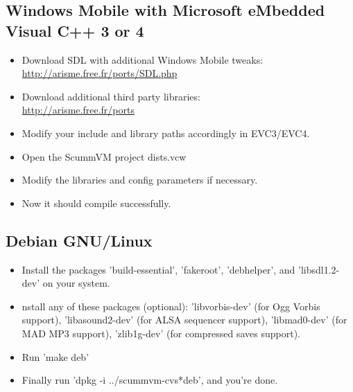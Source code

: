 \subsection{Windows Mobile with Microsoft eMbedded Visual C++ 3 or 4}
  \begin{itemize}
  \item Download SDL with additional Windows Mobile tweaks:\\
    \url{http://arisme.free.fr/ports/SDL.php}
  \item Download additional third party libraries:\\
    \url{http://arisme.free.fr/ports}
  \item Modify your include and library paths accordingly in EVC3/EVC4.
  \item Open the ScummVM project dists\PocketSCUMM.vcw
  \item Modify the libraries and config parameters if necessary.
  \item Now it should compile successfully.
  \end{itemize}
\subsection{Debian GNU/Linux}
  \begin{itemize}
  \item Install the packages 'build-essential', 'fakeroot', 'debhelper',
          and 'libsdl1.2-dev' on your system.
  \item nstall any of these packages (optional): 'libvorbis-dev' (for Ogg
          Vorbis support), 'libasound2-dev' (for ALSA sequencer support),
          'libmad0-dev' (for MAD MP3 support), 'zlib1g-dev' (for compressed
          saves support).
  \item Run 'make deb'
  \item Finally run 'dpkg -i ../scummvm-cvs*deb', and you're done.
  \end{itemize}
